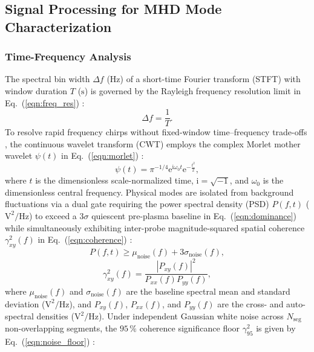 \subsection{Signal Processing for MHD Mode Characterization}

\subsubsection{Time-Frequency Analysis}
The spectral bin width $\Delta f$ ($\mathrm{Hz}$) of a short-time Fourier transform (STFT) with window duration $T$ ($\mathrm{s}$) is governed by the Rayleigh frequency resolution limit in Eq.~(\ref{eqn:freq_res}) \cite{proakis2021digital}:
\begin{equation}
\label{eqn:freq_res}
\Delta f = \frac{1}{T}.
\end{equation}
To resolve rapid frequency chirps without fixed-window time--frequency trade-offs \cite{boashash2015time}, the continuous wavelet transform (CWT) employs the complex Morlet mother wavelet $\psi(t)$ in Eq.~(\ref{eqn:morlet}) \cite{addison2016illustrated}:
\begin{equation}
\label{eqn:morlet}
\psi(t) = \pi^{-1/4} \mathrm{e}^{\mathrm{i} \omega_0 t} \mathrm{e}^{-\frac{t^2}{2}},
\end{equation}
\noindent where $t$ is the dimensionless scale-normalized time, $\mathrm{i} = \sqrt{-1}$, and $\omega_0$ is the dimensionless central frequency. Physical modes are isolated from background fluctuations via a dual gate requiring the power spectral density (PSD) $P(f, t)$ ($\mathrm{V^2/Hz}$) to exceed a $3\sigma$ quiescent pre-plasma baseline in Eq.~(\ref{eqn:dominance}) \cite{bendat2010random} while simultaneously exhibiting inter-probe magnitude-squared spatial coherence $\gamma_{xy}^2(f)$ in Eq.~(\ref{eqn:coherence}) \cite{KraemerFlecken2024, Singh2024}:
\begin{equation}
\label{eqn:dominance}
P(f, t) \ge \mu_{\mathrm{noise}}(f) + 3\sigma_{\mathrm{noise}}(f),
\end{equation}
\begin{equation}
\label{eqn:coherence}
\gamma_{xy}^2(f) = \frac{|P_{xy}(f)|^2}{P_{xx}(f) P_{yy}(f)},
\end{equation}
\noindent where $\mu_{\mathrm{noise}}(f)$ and $\sigma_{\mathrm{noise}}(f)$ are the baseline spectral mean and standard deviation ($\mathrm{V^2/Hz}$), and $P_{xy}(f)$, $P_{xx}(f)$, and $P_{yy}(f)$ are the cross- and auto-spectral densities ($\mathrm{V^2/Hz}$). Under independent Gaussian white noise across $N_{\mathrm{seg}}$ non-overlapping segments, the $95\,\%$ coherence significance floor $\gamma_{95}^2$ is given by Eq.~(\ref{eqn:noise_floor}) \cite{carter1973estimation}:
